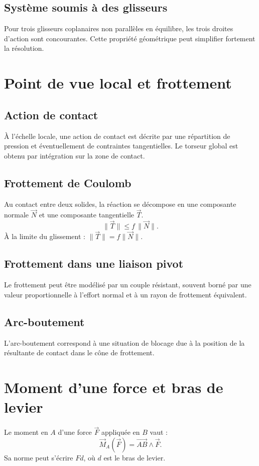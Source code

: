 \subsection{Système soumis à des glisseurs}
Pour trois glisseurs coplanaires non parallèles en équilibre, les trois droites d'action sont concourantes. Cette propriété géométrique peut simplifier fortement la résolution.

\section{Point de vue local et frottement}
\subsection{Action de contact}
À l'échelle locale, une action de contact est décrite par une répartition de pression et éventuellement de contraintes tangentielles. Le torseur global est obtenu par intégration sur la zone de contact.

\subsection{Frottement de Coulomb}
Au contact entre deux solides, la réaction se décompose en une composante normale $\vec N$ et une composante tangentielle $\vec T$.
\[
\|\vec T\|\le f\,\|\vec N\|.
\]
À la limite du glissement : $\|\vec T\|=f\|\vec N\|$.
\TLConeFrottement

\subsection{Frottement dans une liaison pivot}
Le frottement peut être modélisé par un couple résistant, souvent borné par une valeur proportionnelle à l'effort normal et à un rayon de frottement équivalent.

\subsection{Arc-boutement}
L'arc-boutement correspond à une situation de blocage due à la position de la résultante de contact dans le cône de frottement.

\section{Moment d'une force et bras de levier}
Le moment en $A$ d'une force $\vec F$ appliquée en $B$ vaut :
\[
\vec M_A(\vec F)=\overrightarrow{AB}\wedge\vec F.
\]
Sa norme peut s'écrire $Fd$, où $d$ est le bras de levier.
\TLForceMoment

